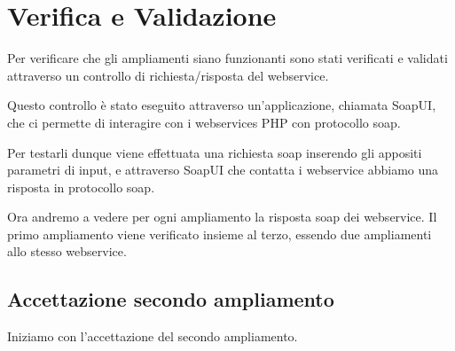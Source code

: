 \newpage

\section{Verifica e Validazione}
\begin{flushleft}
	Per verificare che gli ampliamenti siano funzionanti sono stati verificati e validati attraverso un controllo di richiesta/risposta del webservice.
	\newspace
	
	Questo controllo è stato eseguito attraverso un'applicazione, chiamata SoapUI, che ci permette di interagire con i webservices PHP con protocollo \gls{soap}.
	
	Per testarli dunque viene effettuata una richiesta \gls{soap} inserendo gli appositi parametri di input, e attraverso SoapUI che contatta i webservice abbiamo una risposta in protocollo \gls{soap}.
	\newspace
	
	Ora andremo a vedere per ogni ampliamento la risposta \gls{soap} dei webservice.
	Il primo ampliamento viene verificato insieme al terzo, essendo due ampliamenti allo stesso webservice.
\end{flushleft}
\newpage

\subsection{Accettazione secondo ampliamento}
Iniziamo con l'accettazione del secondo ampliamento.


